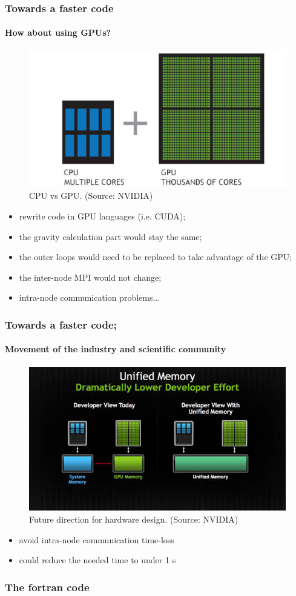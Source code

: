 \documentclass{beamer}
\newcommand\Fontvi{\fontsize{6}{7.2}\selectfont}
\begin{document}
\begin{frame}
\frametitle{Towards a faster code}
\framesubtitle{How about using GPUs?}

\begin{figure}
\includegraphics[width = .5\textwidth]{./cpu_gpu.png}
\caption {CPU vs GPU. (Source: NVIDIA)}
\end{figure}

\begin{itemize}
\item rewrite code in GPU languages (i.e. CUDA);
\item the gravity calculation part would stay the same;
\item the outer loops would need to be replaced to take advantage of the GPU;
\item the inter-node MPI would not change;  
\item intra-node communication problems...


\end{itemize}


\end{frame}

\begin{frame}
\frametitle{Towards a faster code;}
\framesubtitle{Movement of the industry and scientific community}

\begin{figure}
\includegraphics[width = .5\textwidth]{./unified_memory_schematic.jpg}
\caption {Future direction for hardware design. (Source: NVIDIA)}
\end{figure}

\begin{itemize}
\item avoid intra-node communication time-loss 
\item could reduce the needed time to under 1 s

\end{itemize}

\end{frame}



\begin{frame}

\frametitle{The fortran code}

\Fontvi





\end{frame}
\end{document}

